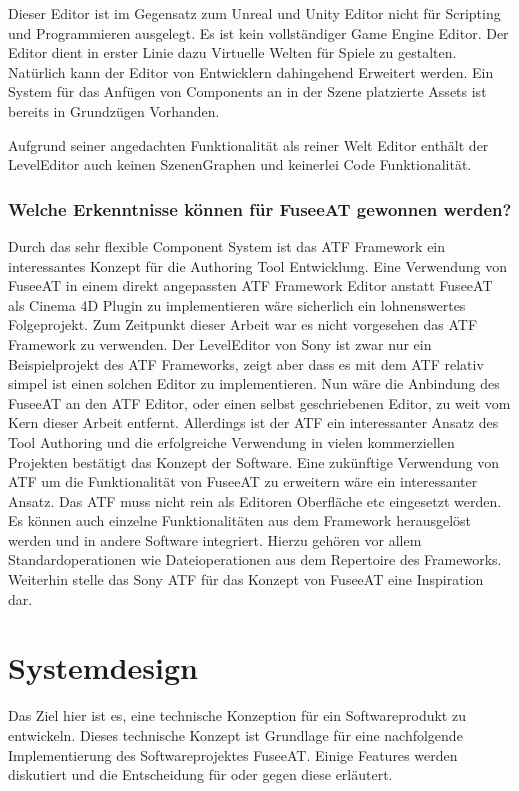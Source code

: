 \documentclass[pagesize, paper=a4, fontsize=12pt, titlepage=true, headings=small, headnosepline, abstractoff, liststotoc, nochapterprefix, plainheadsepline, twoside]{scrreprt}
\begin{document}
Dieser Editor ist im Gegensatz zum Unreal und Unity Editor nicht für Scripting und Programmieren ausgelegt. Es ist kein vollständiger Game Engine Editor. Der Editor dient in erster Linie dazu Virtuelle Welten für Spiele zu gestalten. Natürlich kann der Editor von Entwicklern dahingehend Erweitert werden. Ein System für das Anfügen von Components an in der Szene platzierte Assets ist bereits in Grundzügen Vorhanden.

Aufgrund seiner angedachten Funktionalität als reiner Welt Editor enthält der LevelEditor auch keinen SzenenGraphen und keinerlei Code Funktionalität.

\subsubsection{Welche Erkenntnisse können für FuseeAT gewonnen werden?}
Durch das sehr flexible Component System ist das ATF Framework ein interessantes Konzept für die Authoring Tool Entwicklung. Eine Verwendung von FuseeAT in einem direkt angepassten ATF Framework Editor anstatt FuseeAT als Cinema 4D Plugin zu implementieren wäre sicherlich ein lohnenswertes Folgeprojekt. Zum Zeitpunkt dieser Arbeit war es nicht vorgesehen das ATF Framework zu verwenden. Der LevelEditor von Sony ist zwar nur ein Beispielprojekt des ATF Frameworks, zeigt aber dass es mit dem ATF relativ simpel ist einen solchen Editor zu implementieren. Nun wäre die Anbindung des FuseeAT an den ATF Editor, oder einen selbst geschriebenen Editor,  zu weit vom Kern dieser Arbeit entfernt. Allerdings ist der ATF ein interessanter Ansatz des Tool Authoring und die erfolgreiche Verwendung in vielen kommerziellen Projekten bestätigt das Konzept der Software. Eine zukünftige Verwendung von ATF um die Funktionalität von FuseeAT zu erweitern wäre ein interessanter Ansatz. Das ATF muss nicht rein als Editoren Oberfläche etc eingesetzt werden. Es können auch einzelne Funktionalitäten aus dem Framework herausgelöst werden und in andere Software integriert. Hierzu gehören vor allem Standardoperationen wie Dateioperationen aus dem Repertoire des Frameworks. Weiterhin stelle das Sony ATF für das Konzept von FuseeAT eine Inspiration dar.

\section{Systemdesign}
Das Ziel hier ist es, eine technische Konzeption für ein Softwareprodukt zu entwickeln. Dieses technische Konzept ist Grundlage für eine nachfolgende Implementierung des Softwareprojektes FuseeAT. Einige Features werden diskutiert und die Entscheidung für oder gegen diese erläutert.
\end{document}
